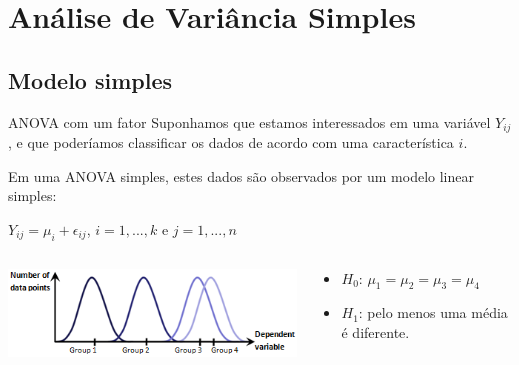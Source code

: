 \documentclass{bredelebeamer}
\begin{document}
\section{Análise de Variância Simples}

\subsection{Modelo simples}

\begin{frame}
\begin{block}{ANOVA com um fator}
Suponhamos que estamos interessados em uma variável $Y_{ij}$, e que
poderíamos classificar os dados de acordo com uma característica $i$.

\vspace{.2cm}

Em uma ANOVA simples, estes dados são observados por um modelo linear
simples: 

\vspace{.2cm}

\begin{center}
$Y_{ij} = \mu_{i} + \epsilon_{ij}$, \hspace{.2cm} $i = 1, ..., k$ 
\hspace{.1cm} e \hspace{.1cm} $j = 1, ..., n$
\end{center}

\vspace{.2cm}

\begin{columns}
\begin{column}{.5\textwidth}
\centering\includegraphics[scale=.3]{images/anova_distributions.png}
\end{column}

\begin{column}{.5\textwidth}
\begin{itemize}
\item $H_{0}$: $\mu_{1} = \mu_{2} = \mu_{3} = \mu_{4}$
\item $H_{1}$: pelo menos uma média é diferente.
\end{itemize}
\end{column}
\end{columns}


\end{block}
\end{frame}
\end{document}
